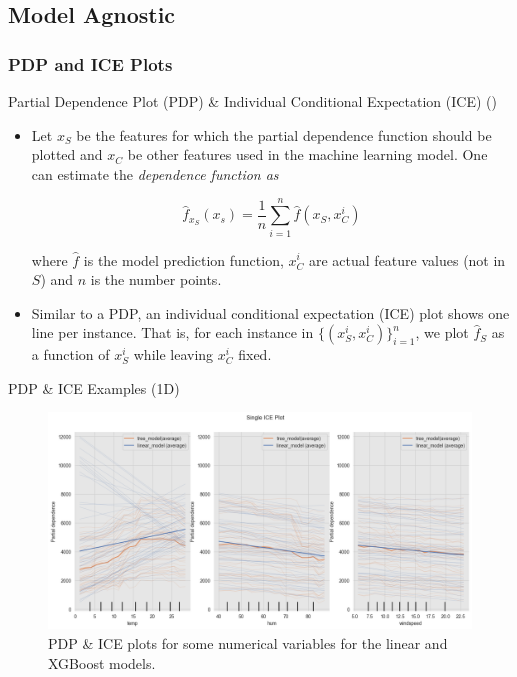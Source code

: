 \documentclass[10pt]{beamer}
\begin{document}
\subsection{Model Agnostic}

\subsubsection{PDP and ICE Plots}

\begin{frame}{Partial Dependence Plot (PDP) \& Individual Conditional Expectation (ICE) (\cite[Section 8.1 \& 9.1]{molnar2019})}
\begin{itemize}
\item Let $x_S$ be the features for which the partial dependence function should be plotted and $x_C$ be other features used in the machine learning model. One can estimate the {\em dependence function as}

$$
\hat{f}_{x_{S}}(x_{s}) = 
\frac{1}{n}
\sum_{i=1}^{n}
\hat{f}(x_{S}, x_{C}^{i})
$$

where $\hat{f}$ is the model prediction function, $x_{C}^{i}$ are actual feature values (not in $S$) and $n$ is the number points.

\pause

\item Similar to a PDP, an individual conditional expectation (ICE) plot shows one line per instance. That is, for each instance in $\{(x_{S}^{i}, x_{C}^{i})\}_{i=1}^{n}$, we plot $\hat{f}_{S}$ as a function of $x_{S}^{i}$ while leaving $x_{C}^{i}$ fixed.
\end{itemize}
\end{frame}

\begin{frame}{PDP \& ICE Examples (1D)}
\begin{center}
  \begin{figure}
    \includegraphics[scale=0.35]{images/interpretable_ml_99_0.png}
    \caption{PDP \& ICE plots for some numerical variables for the linear and XGBoost models.}\label{fig:pdp-ice}
  \end{figure}
\end{center}
\end{frame}
\end{document}
